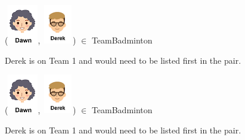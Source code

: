 \documentclass{ximera}
\begin{document}
\begin{exercise}

 ({\includegraphics[width=50px,height=65px]{pics/people/dawn.png}}, {\includegraphics[width=50px,height=65px]{pics/people/derek.png}}) $\in$ TeamBadminton 

  \begin{multipleChoice}
  \end{multipleChoice}
  \begin{feedback}
Derek is on Team 1 and would need to be listed first in the pair.
  \end{feedback}
\end{exercise}



\begin{exercise}

 ({\includegraphics[width=50px,height=65px]{pics/people/dawn.png}}, {\includegraphics[width=50px,height=65px]{pics/people/derek.png}}) $\in$ TeamBadminton 

  \begin{multipleChoice}
  \end{multipleChoice}
  \begin{feedback}
Derek is on Team 1 and would need to be listed first in the pair.
  \end{feedback}
\end{exercise}
\end{document}
